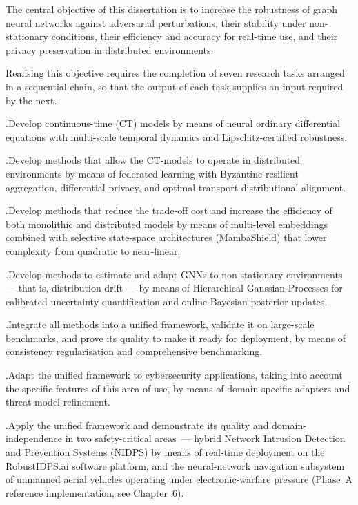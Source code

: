The central objective of this dissertation is to increase the robustness of graph neural networks against adversarial perturbations, their stability under non-stationary conditions, their efficiency and accuracy for real-time use, and their privacy preservation in distributed environments.

Realising this objective requires the completion of seven research tasks arranged in a sequential chain, so that the output of each task supplies an input required by the next.

.\quad Develop continuous-time (CT) models by means of neural ordinary differential equations with multi-scale temporal dynamics and Lipschitz-certified robustness.

.\quad Develop methods that allow the CT-models to operate in distributed environments by means of federated learning with Byzantine-resilient aggregation, differential privacy, and optimal-transport distributional alignment.

.\quad Develop methods that reduce the trade-off cost and increase the efficiency of both monolithic and distributed models by means of multi-level embeddings combined with selective state-space architectures (MambaShield) that lower complexity from quadratic to near-linear.

.\quad Develop methods to estimate and adapt GNNs to non-stationary environments --- that is, distribution drift --- by means of Hierarchical Gaussian Processes for calibrated uncertainty quantification and online Bayesian posterior updates.

.\quad Integrate all methods into a unified framework, validate it on large-scale benchmarks, and prove its quality to make it ready for deployment, by means of consistency regularisation and comprehensive benchmarking.

.\quad Adapt the unified framework to cybersecurity applications, taking into account the specific features of this area of use, by means of domain-specific adapters and threat-model refinement.

.\quad Apply the unified framework and demonstrate its quality and domain-independence in two safety-critical areas~--- hybrid Network Intrusion Detection and Prevention Systems (NIDPS) by means of real-time deployment on the \textsf{RobustIDPS.ai} software platform, and the neural-network navigation subsystem of unmanned aerial vehicles operating under electronic-warfare pressure (Phase~A reference implementation, see Chapter~6).


